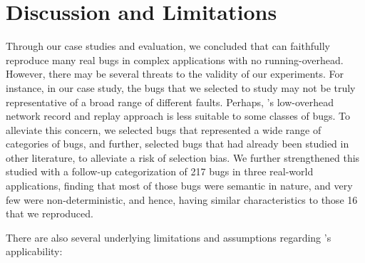 
\section{Discussion and Limitations}
\label{sec:parikshanThreats}

Through our case studies and evaluation, we concluded that \parikshan can faithfully reproduce many real bugs in complex applications with no running-overhead.
However, there may be several threats to the validity of our experiments.
For instance, in our case study, the bugs that we selected to study may not be truly representative of a broad range of different faults.
Perhaps, \parikshan's low-overhead network record and replay approach is less suitable to some classes of bugs.
To alleviate this concern, we selected bugs that represented a wide range of categories of bugs, and further, selected bugs that had already been studied in other literature, to alleviate a risk of selection bias.
We further strengthened this studied with a follow-up categorization of 217 bugs in three real-world applications, finding that most of those bugs were semantic in nature, and very few were non-deterministic, and hence, having similar characteristics to those 16 that we reproduced. 

There are also several underlying limitations and assumptions regarding \parikshan's applicability:



